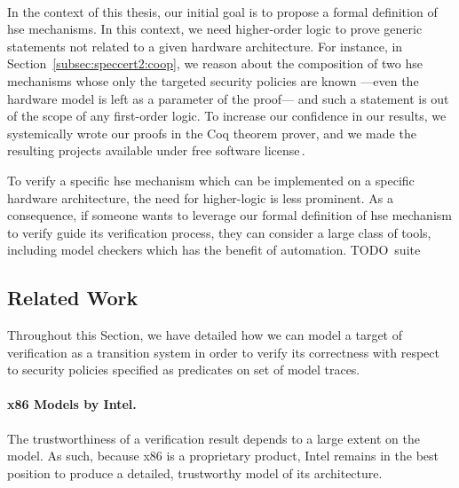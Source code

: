 \paragraph*{}
%
In the context of this thesis, our initial goal is to propose a formal
definition of \ac{hse} mechanisms.
%
In this context, we need higher-order logic to prove generic statements not
related to a given hardware architecture.
%
For instance, in Section~\ref{subsec:speccert2:coop}, we reason about the
composition of two \ac{hse} mechanisms whose only the targeted security policies
are known ---even the hardware model is left as a parameter of the proof--- and
such a statement is out of the scope of any first-order logic.
%
To increase our confidence in our results, we systemically wrote our proofs in
the Coq theorem prover, and we made the resulting projects available under free
software license\,\cite{letan2016speccertcode,letan2018freespeccode}.

To verify a specific \ac{hse} mechanism which can be implemented on a specific
hardware architecture, the need for higher-logic is less prominent.
%
As a consequence, if someone wants to leverage our formal definition of \ac{hse}
mechanism to verify guide its verification process, they can consider a large
class of tools, including model checkers which has the benefit of automation.
%
TODO suite

\subsection{Related Work}
\label{subsec:sota:ltsrelated}

%
Throughout this Section, we have detailed how we can
model a target of verification as a transition system in order to verify its
correctness with respect to security policies specified as predicates on set of
model traces.
%


\paragraph{x86 Models by Intel.}
%
The trustworthiness of a verification result depends to a large extent on the
model.
%
As such, because x86 is a proprietary product, Intel remains in the best
position to produce a detailed, trustworthy model of its architecture. 

